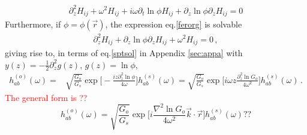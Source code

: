 \documentclass[
 jor,
 amsmath,amssymb,preprint,
]{revtex4-2}
\begin{document}
\begin{align}
\partial_z^2 H_{ij} + \omega^2 H_{ij} + i\omega \partial_t\ln \phi H_{ij} + \partial_z\ln \phi \partial_zH_{ij} = 0 \label{ferorg}
\end{align}
Furthermore, if $\phi = \phi(\vec{r})$, the expression eq.\eqref{ferorg} is solvable
\begin{equation}
\begin{aligned}
\partial_z^2 H_{ij} + \partial_z \ln\phi \partial_z H_{ij} + \omega^2 H_{ij} = 0 \,,
\end{aligned}
\end{equation}
giving rise to, in terms of eq.\eqref{sptsol} in Appendix \ref{sec:appa} with $y(z) = -\frac{1}{2}\partial_z^2g(z)$, $g(z) = \ln\phi$,
\begin{equation}
\begin{aligned}
h^{(o)}_{ab}(\omega) = & \sqrt{\frac{G_o}{G_s}} \exp\bigg[ - \frac{i z\partial_z^2 \ln\phi}{4\omega} \bigg] h_{ab}^{(s)}(\omega) = \sqrt{\frac{G_o}{G_s}} \exp\bigg[i\omega z\frac{\partial_z^2 \ln G_o}{4\omega^2} \bigg] h_{ab}^{(s)}(\omega) \,. \label{fersptsol}
\end{aligned}
\end{equation}
\textcolor{red}{The general form is ??}
\begin{equation}
h^{(o)}_{ab}(\omega) = \sqrt{\frac{G_o}{G_s}} \exp\bigg[i\frac{ \nabla^2 \ln G_o}{4\omega^2} \vec{k}\cdot\vec{r} \bigg] h_{ab}^{(s)}(\omega) ??
\end{equation}
\end{document}
